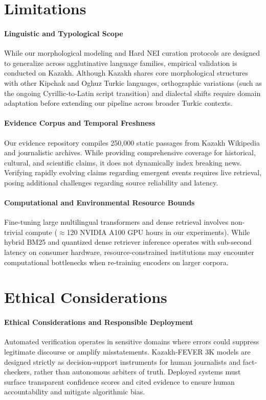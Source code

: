 \section{Limitations}
\label{sec:limitations}

\paragraph{Linguistic and Typological Scope}
While our morphological modeling and Hard NEI curation protocols are designed to generalize across agglutinative language families, empirical validation is conducted on Kazakh. Although Kazakh shares core morphological structures with other Kipchak and Oghuz Turkic languages, orthographic variations (such as the ongoing Cyrillic-to-Latin script transition) and dialectal shifts require domain adaptation before extending our pipeline across broader Turkic contexts.

\paragraph{Evidence Corpus and Temporal Freshness}
Our evidence repository compiles 250,000 static passages from Kazakh Wikipedia and journalistic archives. While providing comprehensive coverage for historical, cultural, and scientific claims, it does not dynamically index breaking news. Verifying rapidly evolving claims regarding emergent events requires live retrieval, posing additional challenges regarding source reliability and latency.

\paragraph{Computational and Environmental Resource Bounds}
Fine-tuning large multilingual transformers and dense retrieval involves non-trivial compute ($\approx$120 NVIDIA A100 GPU hours in our experiments). While hybrid BM25 and quantized dense retriever inference operates with sub-second latency on consumer hardware, resource-constrained institutions may encounter computational bottlenecks when re-training encoders on larger corpora.

\section{Ethical Considerations}
\label{sec:ethics}

\paragraph{Ethical Considerations and Responsible Deployment}
Automated verification operates in sensitive domains where errors could suppress legitimate discourse or amplify misstatements. Kazakh-FEVER 3K models are designed strictly as decision-support instruments for human journalists and fact-checkers, rather than autonomous arbiters of truth. Deployed systems must surface transparent confidence scores and cited evidence to ensure human accountability and mitigate algorithmic bias.
